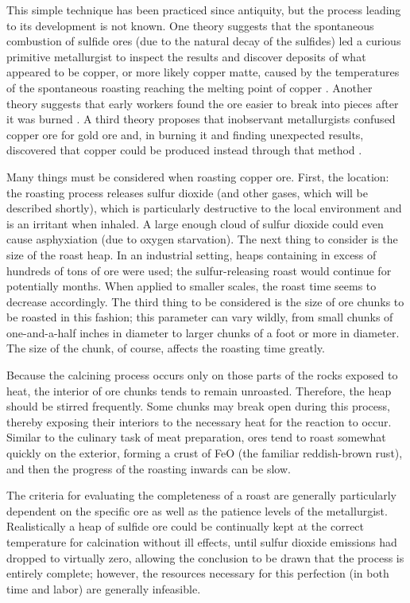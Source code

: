 This simple technique has been practiced since antiquity, but the process
leading to its development is not known.  One theory suggests that the
spontaneous combustion of sulfide ores (due to the natural decay of the
sulfides) led a curious primitive metallurgist to inspect the results and
discover deposits of what appeared to be copper, or more likely copper matte,
caused by the temperatures of the spontaneous roasting reaching the melting
point of copper \cite{peters1887}.  Another theory suggests that early workers
found the ore easier to break into pieces after it was burned
.  A third theory proposes that inobservant metallurgists confused copper ore
for gold ore and, in burning it and finding unexpected results, discovered that
copper could be produced instead through that method
.

Many things must be considered when roasting copper ore.  First, the location:
the roasting process releases sulfur dioxide (and other gases, which will be
described shortly), which is particularly destructive to the local environment
and is an irritant when inhaled.  A large enough cloud of sulfur dioxide could
even cause asphyxiation (due to oxygen starvation).  The next thing to consider
is the size of the roast heap.  In an industrial setting, heaps containing in
excess of hundreds of tons of ore were used; the sulfur-releasing roast would
continue for potentially months.  When applied to smaller scales, the roast time
seems to decrease accordingly.  The third thing to be considered is the size of
ore chunks to be roasted in this fashion; this parameter can vary wildly, from
small chunks of one-and-a-half inches in diameter to larger chunks of a foot or
more in diameter.  The size of the chunk, of course, affects the roasting time
greatly.

Because the calcining process occurs only on those parts of the rocks exposed to
heat, the interior of ore chunks tends to remain unroasted.  Therefore, the heap
should be stirred frequently.  Some chunks may break open during this process,
thereby exposing their interiors to the necessary heat for the reaction to
occur.  Similar to the culinary task of meat preparation, ores tend to roast
somewhat quickly on the exterior, forming a crust of FeO (the familiar
reddish-brown rust), and then the progress of the roasting inwards can be slow.

The criteria for evaluating the completeness of a roast are generally
particularly dependent on the specific ore as well as the patience levels of the
metallurgist.  Realistically a heap of sulfide ore could be continually kept at
the correct temperature for calcination without ill effects, until sulfur
dioxide emissions had dropped to virtually zero, allowing the conclusion to be
drawn that the process is entirely complete; however, the resources necessary
for this perfection (in both time and labor) are generally infeasible.

